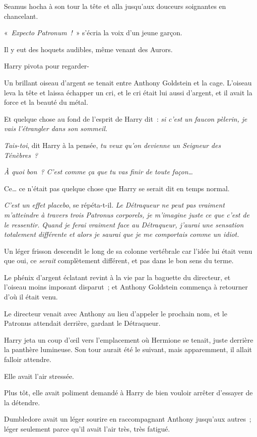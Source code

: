 Seamus hocha à son tour la tête et alla jusqu'aux douceurs soignantes en chancelant.

«~\emph{Expecto Patronum~!}~» s'écria la voix d'un jeune garçon.

Il y eut des hoquets audibles, même venant des Aurors.

Harry pivota pour regarder-

Un brillant oiseau d'argent se tenait entre Anthony Goldstein et la cage.
L'oiseau leva la tête et laissa échapper un cri, et le cri était lui aussi d'argent, et il avait la force et la beauté du métal.

Et quelque chose au fond de l'esprit de Harry dit~: \emph{si c'est un faucon pèlerin, je vais l'étrangler dans son sommeil.}

\emph{Tais-toi}, dit Harry à la pensée, \emph{tu veux qu'on devienne un Seigneur des Ténèbres~?}

\emph{À quoi bon~?
C'est comme ça que tu vas finir de toute façon…}

Ce… ce n'était pas quelque chose que Harry se serait dit en temps normal.

\emph{C'est un effet placebo}, se répéta-t-il.
\emph{Le Détraqueur ne peut pas vraiment m'atteindre à travers trois Patronus corporels, je m'imagine juste ce que c'est de le ressentir.
Quand je ferai vraiment face au Détraqueur, j'aurai une sensation totalement différente et alors je saurai que je me comportais comme un idiot.}

Un léger frisson descendit le long de sa colonne vertébrale car l'idée lui était venu que oui, ce \emph{serait} complètement différent, et pas dans le bon sens du terme.

Le phénix d'argent éclatant revint à la vie par la baguette du directeur, et l'oiseau moins imposant disparut~; et Anthony Goldstein commença à retourner d'où il était venu.

Le directeur venait avec Anthony au lieu d'appeler le prochain nom, et le Patronus attendait derrière, gardant le Détraqueur.

Harry jeta un coup d'œil vers l'emplacement où Hermione se tenait, juste derrière la panthère lumineuse.
Son tour aurait été le suivant, mais apparemment, il allait falloir attendre.

Elle avait l'air stressée.

Plus tôt, elle avait poliment demandé à Harry de bien vouloir arrêter d'essayer de la détendre.

Dumbledore avait un léger sourire en raccompagnant Anthony jusqu'aux autres~; léger seulement parce qu'il avait l'air très, très fatigué.

